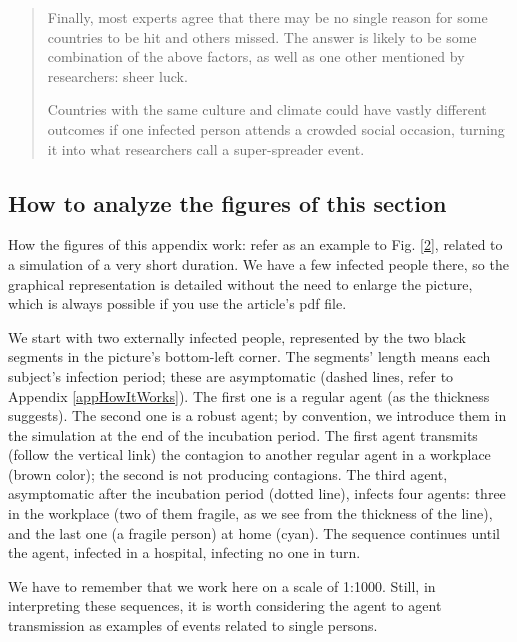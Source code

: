 \documentclass[graybox]{svmult}
\begin{document}
\begin{quote}
Finally, most experts agree that there may be no single reason for some countries to be hit and others missed. The answer is likely to be some combination of the above factors, as well as one other mentioned by researchers: sheer luck.

Countries with the same culture and climate could have vastly different outcomes if one infected person attends a crowded social occasion, turning it into what researchers call a super-spreader event.
\end{quote}



\subsection{How to analyze the figures of this section}
\label{howToAnalyze}

How the figures of this appendix work: refer as an example to Fig. \ref{2}, related to a simulation of a very short duration. We have a few infected people there, so the graphical representation is detailed without the need to enlarge the picture, which is always possible if you use the article's pdf file.

We start with two externally infected people, represented by the two black segments in the picture's bottom-left corner. The segments' length means each subject's infection period; these are asymptomatic (dashed lines, refer to Appendix \ref{appHowItWorks}). The first one is a regular agent (as the thickness suggests). The second one is a robust agent; by convention, we introduce them in the simulation at the end of the incubation period. The first agent transmits (follow the vertical link) the contagion to another regular agent in a workplace (brown color); the second is not producing contagions. The third agent, asymptomatic after the incubation period (dotted line), infects four agents: three in the workplace (two of them fragile, as we see from the thickness of the line), and the last one (a fragile person) at home (cyan). The sequence continues until the  agent, infected in a hospital, infecting no one in turn.

We have to remember that we work here on a scale of 1:1000. Still, in interpreting these sequences, it is worth considering the agent to agent transmission as examples of events related to single persons.


\end{document}
